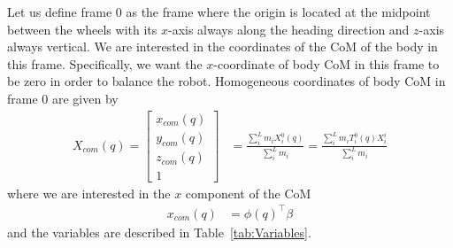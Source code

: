 \documentclass[letterpaper, 10 pt, conference]{ieeeconf}  %
\makeatletter
\newenvironment{conditions}
  {\par\vspace{\abovedisplayskip}\noindent\begin{tabular}{>{$}l<{$} @{${}={}$} l}}
  {\end{tabular}\par\vspace{\belowdisplayskip}}
\makeatother
\begin{document}
Let us define frame $0$ as the frame where the origin  is located at the midpoint between the wheels with its $x$-axis always along the heading direction and $z$-axis always vertical. We are interested in the coordinates of the \ac{CoM} of the body in this frame. Specifically, we want the $x$-coordinate of body \ac{CoM} in this frame to be zero in order to balance the robot. Homogeneous coordinates of body CoM in frame $0$ are given by
\begin{align}
    X_{com}(q) \!= \!\begin{bmatrix} x_{com}(q) \\ y_{com}(q) \\ z_{com}(q) \\ 1 \end{bmatrix} &\!= \! \frac{\sum_{i}^{L} m_i X_i^0(q)}{\sum_{i}^{L} m_i} \!= \! \frac{\sum_{i}^{L} m_i {T}_{i}^{0}(q)X_i^i}{\sum_{i}^{L} m_i} \nonumber
\end{align}
where we are interested in the $x$ component of the CoM
\begin{align}
    x_{com}(q) &= \phi(q)^\top \beta \label{eq:xcom}
\end{align}
and the variables are described in Table~\ref{tab:Variables}.
\end{document}
